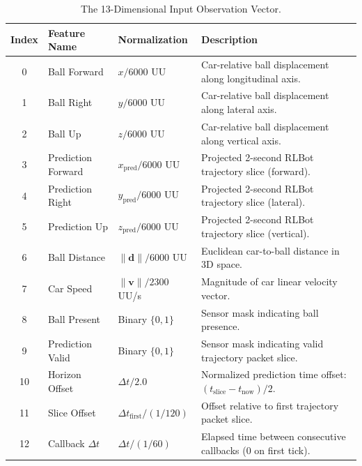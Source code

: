 \documentclass[11pt,a4paper]{article}
\begin{document}
\begin{table}[h!]
\centering
\small
\begin{tabular}{cllp{7.5cm}}
\toprule
\textbf{Index} & \textbf{Feature Name} & \textbf{Normalization} & \textbf{Description} \\
\midrule
0 & Ball Forward & $x / 6000$ UU & Car-relative ball displacement along longitudinal axis. \\
1 & Ball Right & $y / 6000$ UU & Car-relative ball displacement along lateral axis. \\
2 & Ball Up & $z / 6000$ UU & Car-relative ball displacement along vertical axis. \\
3 & Prediction Forward & $x_{\text{pred}} / 6000$ UU & Projected 2-second RLBot trajectory slice (forward). \\
4 & Prediction Right & $y_{\text{pred}} / 6000$ UU & Projected 2-second RLBot trajectory slice (lateral). \\
5 & Prediction Up & $z_{\text{pred}} / 6000$ UU & Projected 2-second RLBot trajectory slice (vertical). \\
6 & Ball Distance & $\|\mathbf{d}\| / 6000$ UU & Euclidean car-to-ball distance in 3D space. \\
7 & Car Speed & $\|\mathbf{v}\| / 2300$ UU/s & Magnitude of car linear velocity vector. \\
8 & Ball Present & Binary $\{0, 1\}$ & Sensor mask indicating ball presence. \\
9 & Prediction Valid & Binary $\{0, 1\}$ & Sensor mask indicating valid trajectory packet slice. \\
10 & Horizon Offset & $\Delta t / 2.0$ & Normalized prediction time offset: $(t_{\text{slice}} - t_{\text{now}})/2$. \\
11 & Slice Offset & $\Delta t_{\text{first}} / (1/120)$ & Offset relative to first trajectory packet slice. \\
12 & Callback $\Delta t$ & $\Delta t / (1/60)$ & Elapsed time between consecutive callbacks ($0$ on first tick). \\
\bottomrule
\end{tabular}
\caption{The 13-Dimensional Input Observation Vector.}
\label{tab:observation}
\end{table}
\end{document}
